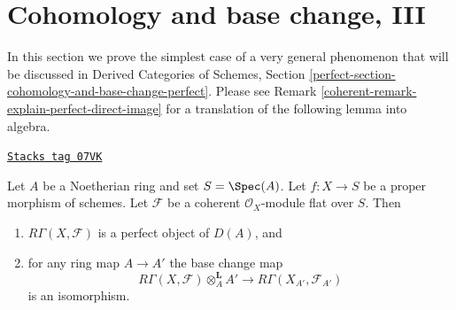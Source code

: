 \section{Cohomology and base change, III}
\label{coherent-section-cohomology-and-base-change-perfect}
In this section we prove the simplest case of a very general phenomenon
that will be discussed in
Derived Categories of Schemes, Section
\ref{perfect-section-cohomology-and-base-change-perfect}.
Please see Remark \ref{coherent-remark-explain-perfect-direct-image} for a translation
of the following lemma into algebra.

\begin{lemma}
\label{coherent-lemma-perfect-direct-image}
\href{https://stacks.math.columbia.edu/tag/07VK}{\texttt{Stacks tag 07VK}}

Let $A$ be a Noetherian ring and set $S = \Spec(A)$. Let $f : X \to S$ be a
proper morphism of schemes. Let $\mathcal{F}$ be a coherent
$\mathcal{O}_X$-module flat over $S$. Then
\begin{enumerate}
\item $R\Gamma(X, \mathcal{F})$ is a perfect object of $D(A)$, and
\item for any ring map $A \to A'$ the base change map
$$
R\Gamma(X, \mathcal{F}) \otimes_A^{\mathbf{L}} A'
\longrightarrow
R\Gamma(X_{A'}, \mathcal{F}_{A'})
$$
is an isomorphism.
\end{enumerate}
\end{lemma}

